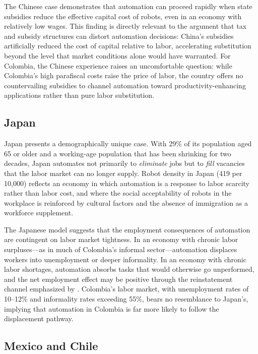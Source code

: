 The Chinese case demonstrates that automation can proceed rapidly when state subsidies reduce the effective capital cost of robots, even in an economy with relatively low wages. This finding is directly relevant to the \cite{acemoglu2020taxes} argument that tax and subsidy structures can distort automation decisions: China's subsidies artificially reduced the cost of capital relative to labor, accelerating substitution beyond the level that market conditions alone would have warranted. For Colombia, the Chinese experience raises an uncomfortable question: while Colombia's high parafiscal costs raise the price of labor, the country offers no countervailing subsidies to channel automation toward productivity-enhancing applications rather than pure labor substitution.

\subsection{Japan}
\label{subsec:japan}

Japan presents a demographically unique case. With 29\% of its population aged 65 or older and a working-age population that has been shrinking for two decades, Japan automates not primarily to \textit{eliminate} jobs but to \textit{fill} vacancies that the labor market can no longer supply. Robot density in Japan (419 per 10,000) reflects an economy in which automation is a response to labor scarcity rather than labor cost, and where the social acceptability of robots in the workplace is reinforced by cultural factors and the absence of immigration as a workforce supplement.

The Japanese model suggests that the employment consequences of automation are contingent on labor market tightness. In an economy with chronic labor surpluses---as in much of Colombia's informal sector---automation displaces workers into unemployment or deeper informality. In an economy with chronic labor shortages, automation absorbs tasks that would otherwise go unperformed, and the net employment effect may be positive through the reinstatement channel emphasized by \cite{acemoglu2019automation}. Colombia's labor market, with unemployment rates of 10--12\% and informality rates exceeding 55\%, bears no resemblance to Japan's, implying that automation in Colombia is far more likely to follow the displacement pathway.

\subsection{Mexico and Chile}
\label{subsec:mexico_chile}

